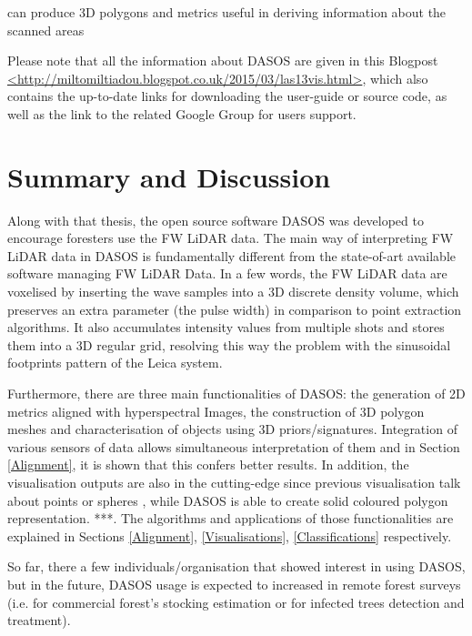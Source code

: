 \documentclass{subfiles}
\begin{document}
	   		can produce 3D polygons and metrics useful in deriving information about the scanned areas
	   		
	   		
	   	
	   	\par Please note that all the information about DASOS are given in this Blogpost \url{<http://miltomiltiadou.blogspot.co.uk/2015/03/las13vis.html>}, which also contains the up-to-date links for downloading the user-guide or source code, as well as the link to the related Google Group for users support. 
	   	 
       
	   	
	   
	   	
	  \section{Summary and Discussion} \label{DASOS-Vol-Summary}
	  
	   	Along with that thesis, the open source software DASOS was developed to encourage foresters use the FW LiDAR data. The main way of interpreting FW LiDAR data in DASOS is fundamentally different from the state-of-art available software managing FW LiDAR Data. In a few words, the FW LiDAR data are voxelised by inserting the wave samples into a 3D discrete density volume, which preserves an extra parameter (the pulse width) in comparison to point extraction algorithms. It also accumulates intensity values from multiple shots and stores them into a 3D regular grid, resolving this way the problem with the sinusoidal footprints pattern of the Leica system.
	   	
	   	Furthermore, there are three main functionalities of DASOS: the generation of 2D metrics aligned with hyperspectral Images, the construction of 3D polygon meshes and characterisation of objects using 3D priors/signatures. Integration of various sensors of data allows simultaneous interpretation of them and in Section \ref{Alignment}, it is shown that this confers better results. In addition, the visualisation outputs are also in the cutting-edge since previous visualisation talk about points \cite{Bunting2013} or spheres \cite{Chauve2009}, while DASOS is able to create solid coloured polygon representation. ***. The algorithms and applications of those functionalities are explained in Sections \ref{Alignment}, \ref{Visualisations}, \ref{Classifications} respectively. 
	   	

	   		
	   	So far, there a few individuals/organisation that showed interest in using DASOS, but in the future, DASOS usage is expected to increased in remote forest surveys (i.e. for commercial forest’s stocking estimation or for infected trees detection and treatment).
	   	
	   	
\end{document}
